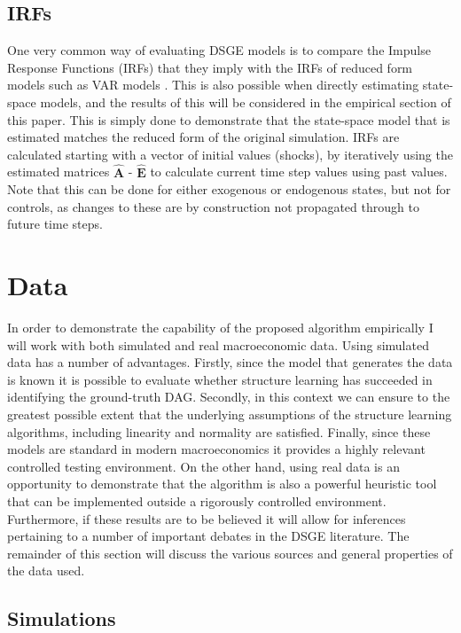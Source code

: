 \documentclass{article}
\begin{document}
\subsection{IRFs}

One very common way of evaluating DSGE models is to compare the Impulse Response Functions (IRFs) that they imply with the IRFs of reduced form models such as VAR models \parencite[p.83]{ramey2016handbook}. This is also possible when directly estimating state-space models, and the results of this will be considered in the empirical section of this paper. This is simply done to demonstrate that the state-space model that is estimated matches the reduced form of the original simulation. IRFs are calculated starting with a vector of initial values (shocks), by iteratively using the estimated matrices $\hat{\mathbf{A}}$ - $\hat{\mathbf{E}}$ to calculate current time step values using past values. Note that this can be done for either exogenous or endogenous states, but not for controls, as changes to these are by construction not propagated through to future time steps.

\section{Data} \label{data}

In order to demonstrate the capability of the proposed algorithm empirically I will work with both simulated and real macroeconomic data. Using simulated data has a number of advantages. Firstly, since the model that generates the data is known it is possible to evaluate whether structure learning has succeeded in identifying the ground-truth DAG. Secondly, in this context we can ensure to the greatest possible extent that the underlying assumptions of the structure learning algorithms, including linearity and normality are satisfied. Finally, since these models are standard in modern macroeconomics it provides a highly relevant controlled testing environment. On the other hand, using real data is an opportunity to demonstrate that the algorithm is also a powerful heuristic tool that can be implemented outside a rigorously controlled environment. Furthermore, if these results are to be believed it will allow for inferences pertaining to a number of important debates in the DSGE literature. The remainder of this section will discuss the various sources and general properties of the data used.

\subsection{Simulations}
\end{document}
